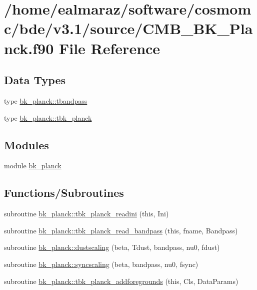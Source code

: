 \hypertarget{CMB__BK__Planck_8f90}{}\section{/home/ealmaraz/software/cosmomc/bde/v3.1/source/\+C\+M\+B\+\_\+\+B\+K\+\_\+\+Planck.f90 File Reference}
\label{CMB__BK__Planck_8f90}
\subsection*{Data Types}
\begin{DoxyCompactItemize}
\item 
type \mbox{\hyperlink{structbk__planck_1_1tbandpass}{bk\+\_\+planck\+::tbandpass}}
\item 
type \mbox{\hyperlink{structbk__planck_1_1tbk__planck}{bk\+\_\+planck\+::tbk\+\_\+planck}}
\end{DoxyCompactItemize}
\subsection*{Modules}
\begin{DoxyCompactItemize}
\item 
module \mbox{\hyperlink{namespacebk__planck}{bk\+\_\+planck}}
\end{DoxyCompactItemize}
\subsection*{Functions/\+Subroutines}
\begin{DoxyCompactItemize}
\item 
subroutine \mbox{\hyperlink{namespacebk__planck_a854764740d5b45a861a35309dcc7ab96}{bk\+\_\+planck\+::tbk\+\_\+planck\+\_\+readini}} (this, Ini)
\item 
subroutine \mbox{\hyperlink{namespacebk__planck_a073f30d6055fdd0e28e842201c1e9fdf}{bk\+\_\+planck\+::tbk\+\_\+planck\+\_\+read\+\_\+bandpass}} (this, fname, Bandpass)
\item 
subroutine \mbox{\hyperlink{namespacebk__planck_a532e314297951fce385bff0bc57f81c3}{bk\+\_\+planck\+::dustscaling}} (beta, Tdust, bandpass, nu0, fdust)
\item 
subroutine \mbox{\hyperlink{namespacebk__planck_ae4ec8dfb07864a47b4f431f0be309608}{bk\+\_\+planck\+::syncscaling}} (beta, bandpass, nu0, fsync)
\item 
subroutine \mbox{\hyperlink{namespacebk__planck_af94e4192bd2f4c8746e6e1108e87a0f0}{bk\+\_\+planck\+::tbk\+\_\+planck\+\_\+addforegrounds}} (this, Cls, Data\+Params)
\end{DoxyCompactItemize}
